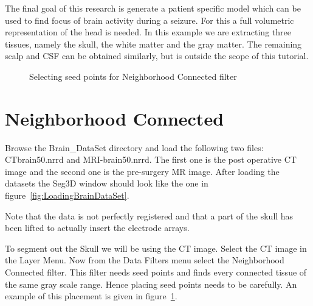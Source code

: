 \documentclass[fleqn,11pt,openany]{book}
\begin{document}
The final goal of this research is generate a patient specific model which can be used to find focus of brain activity during a seizure. For this a full volumetric representation of the head is needed. In this example we are extracting three tissues, namely the skull, the white matter and the gray matter. The remaining scalp and CSF can be obtained similarly, but is outside the scope of this tutorial.

\begin{figure}
\caption{Selecting seed points for Neighborhood Connected filter}\label{fig:NeighborhoodConnected}
\end{figure}
\section{Neighborhood Connected}

Browse the Brain\_DataSet directory and load the following two files: CTbrain50.nrrd and MRI-brain50.nrrd. The first one is the post operative CT image and the second one is the pre-surgery MR image. After loading the datasets the Seg3D window should look like the one in figure~\ref{fig:LoadingBrainDataSet}. 

Note that the data is not perfectly registered and that a part of the skull has been lifted to actually insert the electrode arrays.

To segment out the Skull we will be using the CT image. Select the CT image in the Layer Menu. Now from the Data
 Filters menu select the Neighborhood Connected filter. This filter needs seed points and finds every connected tissue of the same gray scale range. Hence placing seed points needs to be carefully. An example of this placement is given in figure~\ref{fig:NeighborhoodConnected}. 
\end{document}
